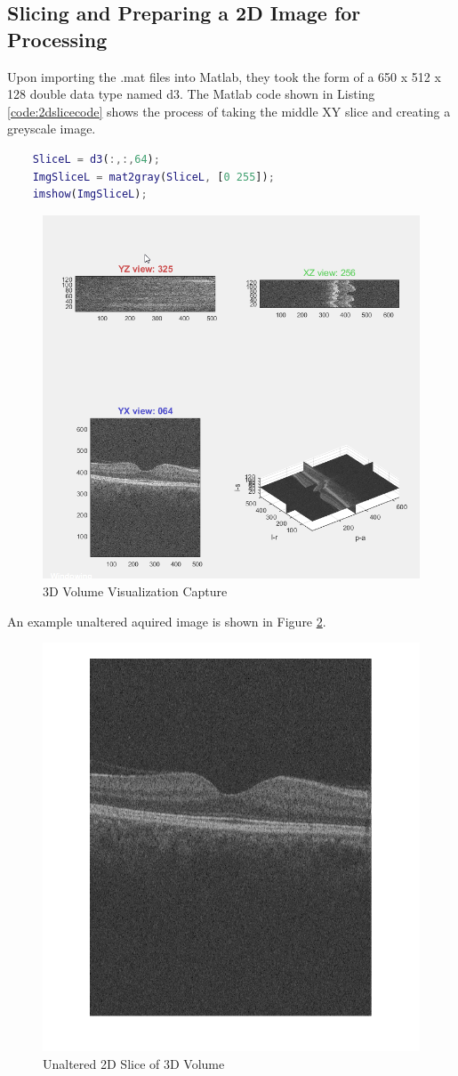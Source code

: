 \documentclass{article}
\begin{document}
	\subsection{\label{sec:level2} Slicing and Preparing a 2D Image for Processing}
		Upon importing the .mat files into Matlab, they took the form of a 650 x 512 x 128 double data type named d3. The Matlab code shown in Listing \ref{code:2dslicecode} shows the process of taking the middle XY slice and creating a greyscale image.
		\begin{lstlisting}[language=Matlab, caption=Take Slice of 3D Volume, label=code:2dslicecode]
	%Take Slice of 3D Volume
	SliceL = d3(:,:,64);
	ImgSliceL = mat2gray(SliceL, [0 255]);
	imshow(ImgSliceL);
		\end{lstlisting}
		\begin{figure}
			\centering
			\includegraphics[width=0.7\linewidth]{Figures/3dvol}
			\caption{3D Volume Visualization Capture}
			\label{fig:3dvol}
		\end{figure}
		An example unaltered aquired image is shown in Figure \ref{fig:2dslice}.
		\begin{figure}
			\centering
			\includegraphics[width=0.7\linewidth]{Figures/2dslice}
			\caption{Unaltered 2D Slice of 3D Volume}
			\label{fig:2dslice}
		\end{figure}
\end{document}
